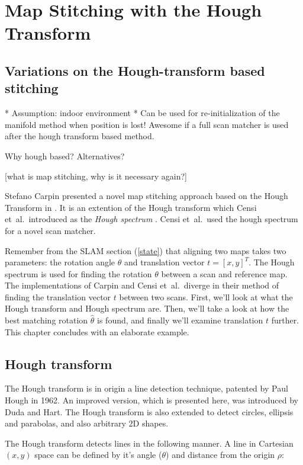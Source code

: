 
\chapter{Map Stitching with the Hough Transform}

\section{Variations on the Hough-transform based stitching}

* Assumption: indoor environment
* Can be used for re-initialization of the manifold method when position is lost! Awesome if a full scan matcher is used after the hough transform based method.


Why hough based?
Alternatives?

[what is map stitching, why is it necessary again?]

Stefano Carpin presented a novel map stitching approach based on the Hough Transform in \cite{carpin2002merging}. It is an extention of the Hough transform which Censi et~al.\ introduced as the \emph{Hough spectrum} \cite{censi2005scan}. Censi et~al.\ used the hough spectrum for a novel scan matcher. 

Remember from the SLAM section (\ref{state}) that aligning two maps takes two parameters: the rotation angle $\theta$ and translation vector $t = [x, y]^T$. The Hough spectrum is used for finding the rotation $\theta$ between a scan and reference map. The implementations of Carpin and Censi et~al.\ diverge in their method of finding the translation vector $t$ between two scans. First, we'll look at what the Hough transform and Hough spectrum are. Then, we'll take a look at how the best matching rotation $\hat\theta$ is found, and finally we'll examine translation $t$ further. This chapter concludes with an elaborate example.

\section{Hough transform}
The Hough transform is in origin a line detection technique, patented by Paul Hough in 1962\cite{hough1962method}. An improved version, which is presented here, was introduced by Duda and Hart\cite{duda1972use}. The Hough transform is also extended to detect circles, ellipsis and parabolas, and also arbitrary 2D shapes\cite{ballard1981generalizing}.

The Hough transform detects lines in the following manner. A line in Cartesian $(x, y)$ space can be defined by it's angle ($\theta$) and distance from the origin $\rho$:

